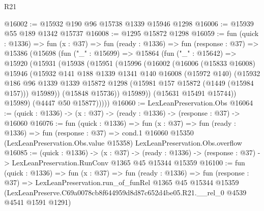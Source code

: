 \begin{lexlean}{R21}
\begin{coremodule}
@16002 := @15932 @190 @96 @15738 @1339 @15946 @1298
@16006 := @15939 @55 @189 @1342 @15737
@16008 := @1295 @15872 @1298
@16059 := fun (quick : @1336) =>
  fun (x : @37) =>
  fun (ready : @1336) =>
  fun (response : @37) =>
  @15386
    (@15698
      (fun ("_" : @15699) =>
      @15864
        (fun ("_" : @15642) =>
        @15920
          (@15931
            (@15938
              (@15951
                (@15996
                  (@16002
                    (@16006
                      (@15833 @16008)
                      @15946
                      (@15932
                        @141
                        @188
                        @1339
                        @1341
                        @140
                        @16008
                        (@15972 @140)
                        (@15932
                          @186
                          @96
                          @1339
                          @1339
                          @15872
                          @1298
                          (@15981 @157 @15872 (@1449 (@15984 @157)))
                          @15989))
                      (@15848 @15736))
                    @15989))
                (@15631 @15491 @15744))
              @15989)
            (@4447 @50 @15877)))))
@16060 := LexLeanPreservation.Obs
@16064 := (quick : @1336) -> (x : @37) -> (ready : @1336) -> (response : @37) -> @16060
@16076 := fun (quick : @1336) =>
  fun (x : @37) =>
  fun (ready : @1336) =>
  fun (response : @37) =>
  cond.{1} @16060 @15350 (LexLeanPreservation.Obs.value @15358) LexLeanPreservation.Obs.overflow
@16085 := (quick : @1336) ->
  (x : @37) ->
  (ready : @1336) -> (response : @37) -> LexLeanPreservation.RunConv @1365 @45 @15344 @15359
@16100 := fun (quick : @1336) =>
  fun (x : @37) =>
  fun (ready : @1336) =>
  fun (response : @37) =>
  LexLeanPreservation.run_of_funRel
    @1365
    @45
    @15344
    @15359
    (LexLeanPreserve.C69a0078cb8f644959d8d87c652d4be05.R21.__rel_0 @4539 @4541 @1591 @1291)
\end{coremodule}
\end{lexlean}
